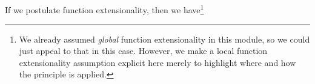 \begin{code}
\AgdaSpace{}%
\AgdaSpace{}%
\AgdaSpace{}%
\AgdaSpace{}%
\AgdaDottedPattern{\AgdaSymbol{)}}\AgdaSpace{}%
\AgdaOperator{\AgdaInductiveConstructor{,}}\AgdaSpace{}%
\AgdaSpace{}%
\AgdaOperator{\AgdaInductiveConstructor{,}}\AgdaSpace{}%
\AgdaSymbol{)}\AgdaSpace{}%
\AgdaSymbol{=}\<%
\\
%
\\[\AgdaEmptyExtraSkip]%
\>[1][@{}l@{\AgdaIndent{0}}]%
\>[2]\AgdaSpace{}%
\AgdaSpace{}%
\AgdaSymbol{=}\AgdaSpace{}%
\AgdaSymbol{(}\AgdaSpace{}%
\AgdaSpace{}%
\AgdaSpace{}%
\AgdaSpace{}%
\AgdaSpace{}%
\AgdaSpace{}%
\AgdaOperator{\AgdaInductiveConstructor{,}}\AgdaSpace{}%
\AgdaSpace{}%
\AgdaOperator{\AgdaInductiveConstructor{,}}\AgdaSpace{}%
\AgdaSymbol{)}\AgdaSpace{}%
\<%
\\
%
\\[\AgdaEmptyExtraSkip]%
\>[2][@{}l@{\AgdaIndent{0}}]%
\>[3]\AgdaSpace{}%
\AgdaSpace{}%
\AgdaSpace{}%
%
\>[13]\AgdaSpace{}%
\AgdaSymbol{(}\AgdaSpace{}%
\AgdaSymbol{)}\AgdaSpace{}%
%
\>[37]\AgdaSpace{}%
\AgdaSpace{}%
\AgdaSpace{}%
%
\>[47]\AgdaSpace{}%
\AgdaSymbol{(}\AgdaSymbol{)}\AgdaSpace{}%
%
\>[69]\AgdaSpace{}%
\AgdaSpace{}%
\AgdaSpace{}%
%
\>[79]\<%
\end{code}
\ccpad
If we postulate function extensionality, then we have\footnote{%
We already assumed \emph{global} function extensionality in this module, so we could just appeal to that in this case.  However, we make a local function extensionality assumption explicit here merely to highlight where and how the principle is applied.}
\ccpad
